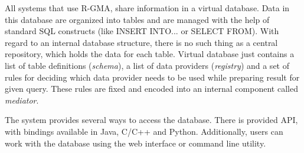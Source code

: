 All systems that use R-GMA, share information in a virtual database. Data in this database are organized into tables and are managed with the help of standard SQL constructs (like INSERT INTO... or SELECT FROM). With regard to an internal database structure, there is no such thing as a central repository, which holds the data for each table. Virtual database just contains a list of table definitions (\emph{schema}), a list of data providers (\emph{registry}) and a set of rules for deciding which data provider needs to be used while preparing result for given query. These rules are fixed and encoded into an internal component called \emph{mediator}.

The system provides several ways to access the database. There is provided API, with bindings available in Java, C/C++ and Python. Additionally, users can work with the database using the web interface or command line utility.